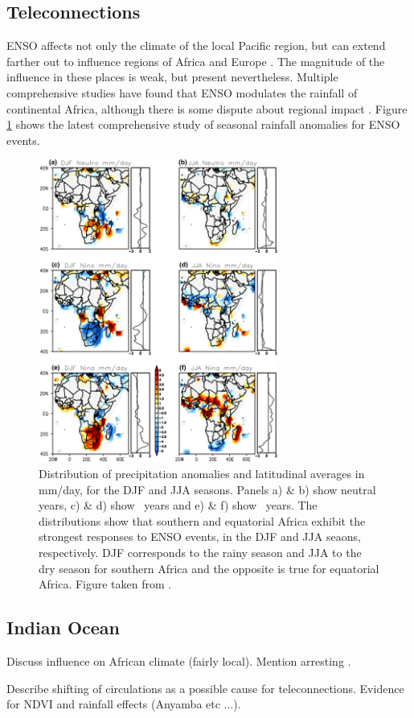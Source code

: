 
\subsection{Teleconnections}
ENSO affects not only the climate of the local Pacific region, but can extend
farther out to influence regions of Africa and Europe \citep{moron1998}. The
magnitude of the influence in these places is weak, but present
nevertheless. Multiple comprehensive studies \citep{ropelewski1987,
  ropelewski1989, nicholson1996} have found that ENSO modulates the rainfall of
continental Africa, although there is some dispute about regional impact
\citep{wolter1989}. Figure \ref{fig:enso_rainfall_anoms} shows the latest
comprehensive study of seasonal rainfall anomalies for ENSO events.

\begin{figure}
  \centering
  \includegraphics[width=0.7\textwidth]{figures/enso_africa_rainfall_anoms}
  \caption{Distribution of precipitation anomalies and latitudinal averages in
    mm/day, for the DJF and JJA seasons. Panels a) \& b) show neutral years, c)
    \& d) show \elnino\ years and e) \& f) show \nina\ years. The distributions
    show that southern and equatorial Africa exhibit the strongest responses to
    ENSO events, in the DJF and JJA seaons, respectively. DJF corresponds to the
    rainy season and JJA to the dry season for southern Africa and the opposite
    is true for equatorial Africa. Figure taken from \cite{deoliveira2018}.}
  \label{fig:enso_rainfall_anoms}
\end{figure}

\subsection{Indian Ocean}
Discuss influence on African climate (fairly local). Mention arresting .



Describe shifting of circulations as a possible cause for
teleconnections. Evidence for NDVI and rainfall effects (Anyamba etc ...).

